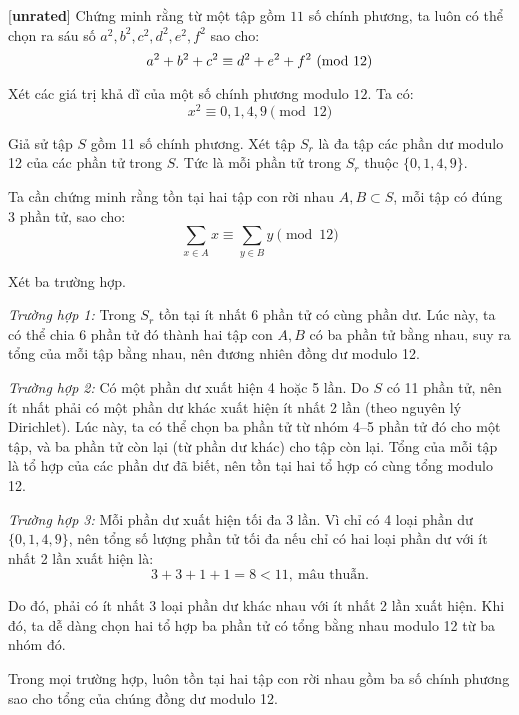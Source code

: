 \documentclass[../01-divisibility.tex]{subfiles}
\begin{document}
\begin{example*}\label{example:IND-2015-N6}[\textbf{unrated}]
	Chứng minh rằng từ một tập gồm \( 11 \) số chính phương, ta luôn có thể chọn ra sáu số \( a^2, b^2, c^2, d^2, e^2, f^2 \) sao cho:
	\[
		a^2 + b^2 + c^2 \equiv d^2 + e^2 + f^2 \ (\mathrm{mod}\ 12)
	\]
\end{example*}

\begin{soln}
	Xét các giá trị khả dĩ của một số chính phương modulo \( 12 \). Ta có:
	\[
		x^2 \equiv 0, 1, 4, 9 \pmod{12}
	\]
	
	Giả sử tập \( S \) gồm 11 số chính phương. Xét tập \( S_r \) là đa tập các phần dư modulo 12 của các phần tử trong \( S \).
	Tức là mỗi phần tử trong \( S_r \) thuộc \( \{0, 1, 4, 9\} \).
	
	Ta cần chứng minh rằng tồn tại hai tập con rời nhau \( A, B \subset S \), mỗi tập có đúng 3 phần tử, sao cho:
	\[
		\sum_{x \in A} x \equiv \sum_{y \in B} y \pmod{12}
	\]
	
	Xét ba trường hợp.
	
	\textit{Trường hợp 1:} Trong \( S_r \) tồn tại ít nhất 6 phần tử có cùng phần dư.
	Lúc này, ta có thể chia 6 phần tử đó thành hai tập con \( A, B \) có ba phần tử bằng nhau, suy ra tổng của mỗi tập bằng nhau, nên đương nhiên đồng dư modulo 12.
	
	\textit{Trường hợp 2:} Có một phần dư xuất hiện 4 hoặc 5 lần.
	Do \( S \) có 11 phần tử, nên ít nhất phải có một phần dư khác xuất hiện ít nhất 2 lần (theo nguyên lý Dirichlet). Lúc này, ta có thể chọn ba phần tử từ nhóm 4–5 phần tử đó cho một tập, và ba phần tử còn lại (từ phần dư khác) cho tập còn lại. Tổng của mỗi tập là tổ hợp của các phần dư đã biết, nên tồn tại hai tổ hợp có cùng tổng modulo 12.
	
	\textit{Trường hợp 3:} Mỗi phần dư xuất hiện tối đa 3 lần.
	Vì chỉ có 4 loại phần dư \( \{0, 1, 4, 9\} \), nên tổng số lượng phần tử tối đa nếu chỉ có hai loại phần dư với ít nhất 2 lần xuất hiện là:
	\[
		3 + 3 + 1 + 1 = 8 < 11,\ \text{mâu thuẫn.}
	\]
	
	Do đó, phải có ít nhất 3 loại phần dư khác nhau với ít nhất 2 lần xuất hiện. Khi đó, ta dễ dàng chọn hai tổ hợp ba phần tử có tổng bằng nhau modulo 12 từ ba nhóm đó.

	Trong mọi trường hợp, luôn tồn tại hai tập con rời nhau gồm ba số chính phương sao cho tổng của chúng đồng dư modulo 12.
\end{soln}

\end{document}
